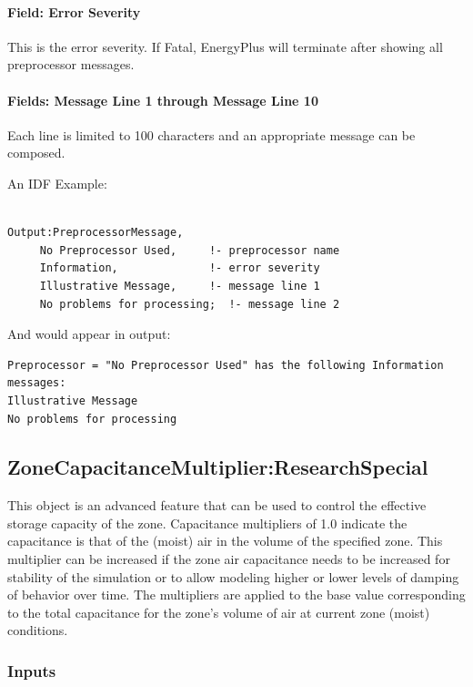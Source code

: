 \paragraph{Field: Error Severity}\label{field-error-severity}

This is the error severity. If Fatal, EnergyPlus will terminate after showing all preprocessor messages.

\paragraph{Fields: Message Line 1 through Message Line 10}\label{fields-message-line-1-through-message-line-10}

Each line is limited to 100 characters and an appropriate message can be composed.

An IDF Example:

\begin{lstlisting}

Output:PreprocessorMessage,
     No Preprocessor Used,     !- preprocessor name
     Information,              !- error severity
     Illustrative Message,     !- message line 1
     No problems for processing;  !- message line 2
\end{lstlisting}

And would appear in output:

\begin{lstlisting}
Preprocessor = "No Preprocessor Used" has the following Information messages:
Illustrative Message
No problems for processing
\end{lstlisting}

\subsection{ZoneCapacitanceMultiplier:ResearchSpecial}\label{zonecapacitancemultiplierresearchspecial}

This object is an advanced feature that can be used to control the effective storage capacity of the zone. Capacitance multipliers of 1.0 indicate the capacitance is that of the (moist) air in the volume of the specified zone. This multiplier can be increased if the zone air capacitance needs to be increased for stability of the simulation or to allow modeling higher or lower levels of damping of behavior over time. The multipliers are applied to the base value corresponding to the total capacitance for the zone's volume of air at current zone (moist) conditions.

\subsubsection{Inputs}\label{inputs-14-014}

